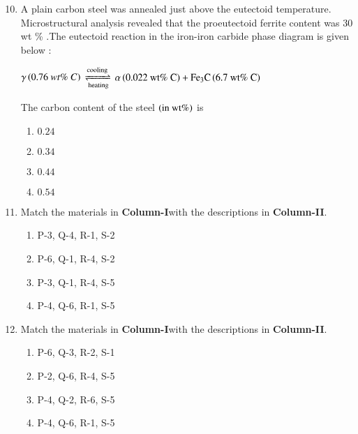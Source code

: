 \documentclass[journal]{IEEEtran}
\begin{document}
\begin{enumerate}
\setcounter{enumi}{9}

\item A plain carbon steel was annealed just above the eutectoid temperature. Microstructural analysis revealed that the proeutectoid ferrite content was 30 wt \% .The eutectoid reaction in the iron-iron carbide phase diagram is given below :

\begin{center}
    $\gamma\left(0.76\ wt\% \ C\right)$ $\xrightleftharpoons[\text{heating}]{\text{cooling}}$ 
    $\alpha\left(0.022\ \text{wt}\%\ \text{C}\right) + \text{Fe}  _3\text{C} \left(6.7\ \text{wt}\% \ \text{C} \right)$
\end{center} 

The carbon content of the steel $\left(\text{in wt}\%\right)$ is
\begin{multicols}{4}
\begin{enumerate}
    \item $0.24$
    \item $0.34$
    \item $0.44$
    \item $0.54$
\end{enumerate}
\end{multicols}

\item Match the materials in \textbf{Column-I}with the descriptions in \textbf{Column-II}.
\begin{table}[h]
    \centering
    
    \label{tab:my_label}
\end{table}
\begin{multicols}{2}
\begin{enumerate}
    \item P-3, Q-4, R-1, S-2
    \item P-6, Q-1, R-4, S-2
    \item P-3, Q-1, R-4, S-5
    \item P-4, Q-6, R-1, S-5
\end{enumerate}
\end{multicols}

\item Match the materials in \textbf{Column-I}with the descriptions in \textbf{Column-II}.
\begin{table}[h]
    \centering
    
    \label{tab:my_label}
\end{table}
\begin{multicols}{2}
\begin{enumerate}
    \item P-6, Q-3, R-2, S-1
    \item P-2, Q-6, R-4, S-5
    \item P-4, Q-2, R-6, S-5
    \item P-4, Q-6, R-1, S-5
\end{enumerate}
\end{multicols}


\end{enumerate}
\end{document}
